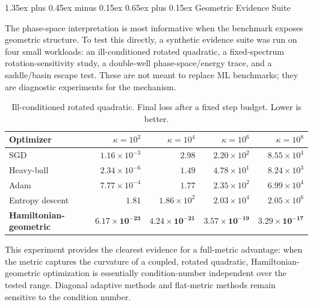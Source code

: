 \documentclass[10pt,twocolumn]{article}
\makeatletter
\renewcommand\section{\@startsection{section}{1}{0pt}%
  {1.35ex plus 0.45ex minus 0.15ex}%
  {0.65ex plus 0.15ex}%
  {\large\bfseries}}
\makeatother
\begin{document}
\section{Geometric Evidence Suite}
\label{sec:geometric-evidence}

The phase-space interpretation is most informative when the benchmark exposes
geometric structure. To test this directly, a synthetic evidence suite was run
on four small workloads: an ill-conditioned rotated quadratic, a fixed-spectrum
rotation-sensitivity study, a double-well phase-space/energy trace, and a
saddle/basin escape test. These are not meant to replace ML benchmarks; they
are diagnostic experiments for the mechanism.

\begin{table}[t]
\centering
\caption{Ill-conditioned rotated quadratic. Final loss after a fixed step
budget. Lower is better.}
\label{tab:condition-scaling}
\begin{tabular}{@{}lrrrr@{}}
\toprule
Optimizer & $\kappa=10^2$ & $\kappa=10^4$ & $\kappa=10^6$ & $\kappa=10^8$ \\
\midrule
SGD & $1.16\times10^{-3}$ & $2.98$ & $2.20\times10^2$ & $8.55\times10^4$ \\
Heavy-ball & $2.34\times10^{-6}$ & $1.49$ & $4.78\times10^1$ & $8.24\times10^3$ \\
Adam & $7.77\times10^{-4}$ & $1.77$ & $2.35\times10^2$ & $6.99\times10^4$ \\
Entropy descent & $1.81$ & $1.86\times10^2$ & $2.03\times10^4$ & $2.05\times10^6$ \\
\textbf{Hamiltonian-geometric} & $\mathbf{6.17\times10^{-23}}$ & $\mathbf{4.24\times10^{-21}}$ & $\mathbf{3.57\times10^{-19}}$ & $\mathbf{3.29\times10^{-17}}$ \\
\bottomrule
\end{tabular}
\end{table}

This experiment provides the clearest evidence for a full-metric advantage:
when the metric captures the curvature of a coupled, rotated quadratic,
Hamiltonian-geometric optimization is essentially condition-number independent
over the tested range. Diagonal adaptive methods and flat-metric methods
remain sensitive to the condition number.
\end{document}
